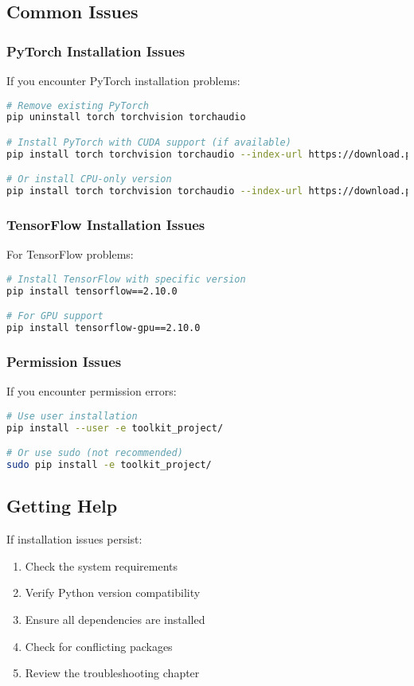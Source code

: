 \subsection{Common Issues}

\subsubsection{PyTorch Installation Issues}

If you encounter PyTorch installation problems:

\begin{lstlisting}[language=bash, caption=Fixing PyTorch installation]
# Remove existing PyTorch
pip uninstall torch torchvision torchaudio

# Install PyTorch with CUDA support (if available)
pip install torch torchvision torchaudio --index-url https://download.pytorch.org/whl/cu118

# Or install CPU-only version
pip install torch torchvision torchaudio --index-url https://download.pytorch.org/whl/cpu
\end{lstlisting}

\subsubsection{TensorFlow Installation Issues}

For TensorFlow problems:

\begin{lstlisting}[language=bash, caption=Fixing TensorFlow installation]
# Install TensorFlow with specific version
pip install tensorflow==2.10.0

# For GPU support
pip install tensorflow-gpu==2.10.0
\end{lstlisting}

\subsubsection{Permission Issues}

If you encounter permission errors:

\begin{lstlisting}[language=bash, caption=Fixing permission issues]
# Use user installation
pip install --user -e toolkit_project/

# Or use sudo (not recommended)
sudo pip install -e toolkit_project/
\end{lstlisting}

\subsection{Getting Help}

If installation issues persist:

\begin{enumerate}
    \item Check the system requirements
    \item Verify Python version compatibility
    \item Ensure all dependencies are installed
    \item Check for conflicting packages
    \item Review the troubleshooting chapter
\end{enumerate} 